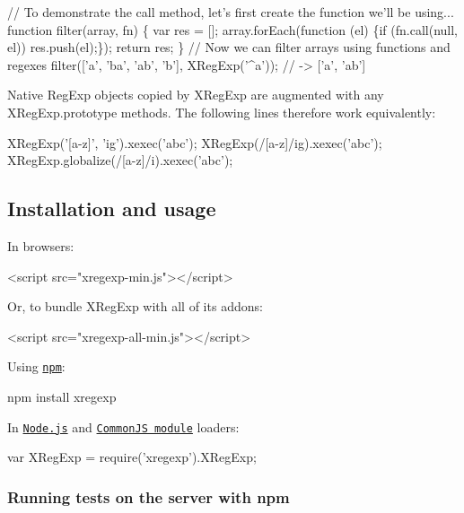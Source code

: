 \begin{DoxyCode}
// To demonstrate the call method, let's first create the function we'll be using...
function filter(array, fn) \{
    var res = [];
    array.forEach(function (el) \{if (fn.call(null, el)) res.push(el);\});
    return res;
\}
// Now we can filter arrays using functions and regexes
filter(['a', 'ba', 'ab', 'b'], XRegExp('^a')); // -> ['a', 'ab']
\end{DoxyCode}


Native {\ttfamily Reg\+Exp} objects copied by {\ttfamily X\+Reg\+Exp} are augmented with any {\ttfamily X\+Reg\+Exp.\+prototype} methods. The following lines therefore work equivalently\+:


\begin{DoxyCode}
XRegExp('[a-z]', 'ig').xexec('abc');
XRegExp(/[a-z]/ig).xexec('abc');
XRegExp.globalize(/[a-z]/i).xexec('abc');
\end{DoxyCode}


\subsection*{Installation and usage}

In browsers\+:


\begin{DoxyCode}
<script src="xregexp-min.js"></script>
\end{DoxyCode}


Or, to bundle X\+Reg\+Exp with all of its addons\+:


\begin{DoxyCode}
<script src="xregexp-all-min.js"></script>
\end{DoxyCode}


Using \href{http://npmjs.org/}{\tt npm}\+:


\begin{DoxyCode}
npm install xregexp
\end{DoxyCode}


In \href{http://nodejs.org/}{\tt Node.\+js} and \href{http://wiki.commonjs.org/wiki/Modules}{\tt Common\+JS module} loaders\+:


\begin{DoxyCode}
var XRegExp = require('xregexp').XRegExp;
\end{DoxyCode}


\subsubsection*{Running tests on the server with npm}


